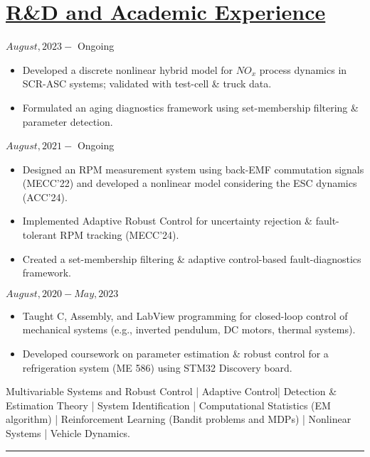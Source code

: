 \section*{\underline{R\&D and Academic Experience}}
\noindent {} \hfill $August, 2023 - $ Ongoing
\begin{itemize}
        \item Developed a discrete nonlinear hybrid model for $NO_x$ process dynamics in SCR-ASC systems; validated with test-cell \& truck data.
        \item Formulated an aging diagnostics framework using set-membership filtering \& parameter detection.
\end{itemize}

\medskip

\noindent {} \hfill $August, 2021 - $ Ongoing
\begin{itemize}
        \item Designed an RPM measurement system using back-EMF commutation signals (MECC'22) and developed a nonlinear model considering the ESC dynamics (ACC'24).
        \item Implemented Adaptive Robust Control for uncertainty rejection \& fault-tolerant RPM tracking (MECC'24).
        \item Created a set-membership filtering \& adaptive control-based fault-diagnostics framework.
\end{itemize}

\medskip

\noindent {} \hfill $August, 2020 - May, 2023$
\begin{itemize}
        \item Taught C, Assembly, and LabView programming for closed-loop control of mechanical systems (e.g., inverted pendulum, DC motors, thermal systems).

        \item {} Developed coursework on parameter estimation \& robust control for a refrigeration system (ME 586) using STM32 Discovery board.
\end{itemize}
\medskip
 Multivariable Systems and Robust Control |
                        Adaptive Control|
                        Detection \& Estimation Theory |
                        System Identification |
                        Computational Statistics (EM algorithm) |
                        Reinforcement Learning (Bandit problems and MDPs) |
                        Nonlinear Systems | Vehicle Dynamics.

\noindent\rule{\textwidth}{0.4pt}

